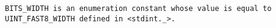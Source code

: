 \tt{BITS_WIDTH} is an enumeration constant whose value is
equal to \tt{UINT_FAST8_WIDTH} defined in \tt{<stdint._>}.
